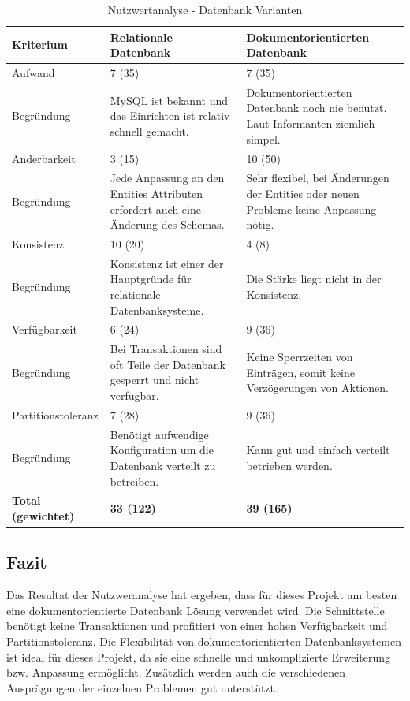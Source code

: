 \begin{table}[ht]
\centering
  \begin{tabular}{>{\columncolor{darkgray}} l | p{5cm} | p{5cm}}
	\hline
	\rowcolor{darkgray}
	\textbf{Kriterium}		&	\textbf{Relationale Datenbank} 	&	\textbf{Dokumentorientierten Datenbank}	\\ \hline
	\rowcolor{gray}
	Aufwand		&	7 (35)		&	7 (35)		\\ \hline
	Begründung		&	MySQL ist bekannt und das Einrichten ist relativ schnell gemacht.			
				&	Dokumentorientierten Datenbank noch nie benutzt. Laut Informanten ziemlich simpel.	\\ \hline
	\rowcolor{gray}
	Änderbarkeit		&	3 (15)		&	10 (50)		\\ \hline
	Begründung		&	Jede Anpassung an den Entities Attributen erfordert auch eine Änderung des Schemas.
				&	Sehr flexibel, bei Änderungen der Entities oder neuen Probleme keine Anpassung nötig.\\ \hline
	\rowcolor{gray}
	Konsistenz		&	10 (20)	&	4 (8)		\\ \hline
	Begründung		&	Konsistenz ist einer der Hauptgründe für relationale Datenbanksysteme.			
				&	Die Stärke liegt nicht in der Konsistenz.\\ \hline
	\rowcolor{gray}
	Verfügbarkeit	&	6 (24)	&	9 (36)		\\ \hline
	Begründung		&	Bei Transaktionen sind oft Teile der Datenbank gesperrt und nicht verfügbar.					
				&	Keine Sperrzeiten von Einträgen, somit keine Verzögerungen von Aktionen.	\\ \hline
	\rowcolor{gray}
	Partitionstoleranz	&	7 (28)	&	9 (36)		\\ \hline
	Begründung		&	Benötigt aufwendige Konfiguration um die Datenbank verteilt zu betreiben.
				&	Kann gut und einfach verteilt betrieben werden.		\\ \hline \hline
	\rowcolor{gray}
	\textbf{Total (gewichtet)}	&	\textbf{33 (122)}	&	\textbf{39 (165)}	\\ \hline
  \end{tabular}
   \caption{Nutzwertanalyse - Datenbank Varianten}\label{table:bewertungskriterien}
\end{table}

\FloatBarrier
\subsection{Fazit}\label{architektur_fazit}
Das Resultat der Nutzweranalyse hat ergeben, dass für dieses Projekt am besten eine dokumentorientierte Datenbank Lösung verwendet wird.
Die Schnittstelle benötigt keine Transaktionen und profitiert von einer hohen Verfügbarkeit und Partitionstoleranz. Die Flexibilität
von dokumentorientierten Datenbanksystemen ist ideal für dieses Projekt, da sie eine schnelle und unkomplizierte Erweiterung bzw. Anpassung ermöglicht. Zusätzlich werden 
auch die verschiedenen Ausprägungen der einzelnen Problemen gut unterstützt.


